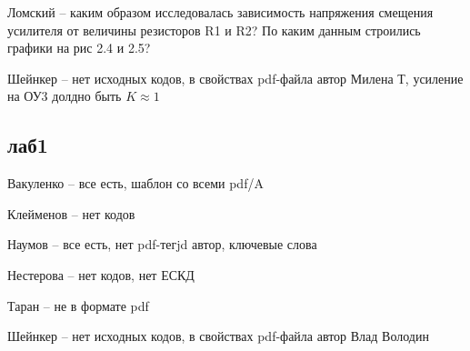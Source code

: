 \documentclass[a4paper,11pt]{article}
\begin{document}

Ломский -- каким образом исследовалась зависимость напряжения смещения усилителя от величины резисторов R1 и R2?
 По каким данным  строились графики на рис 2.4 и 2.5?

Шейнкер -- нет исходных кодов, в свойствах pdf-файла автор Милена Т, усиление на ОУ3 долдно быть $K \approx 1$

\newpage
\subsection*{лаб1}
Вакуленко -- все есть, шаблон со всеми pdf/A 

Клейменов -- нет кодов

Наумов -- все есть, нет pdf-тегjd автор, ключевые слова

Нестерова -- нет кодов, нет ЕСКД

Таран -- не в формате pdf

Шейнкер -- нет исходных кодов, в свойствах pdf-файла автор Влад Володин 
\end{document}
